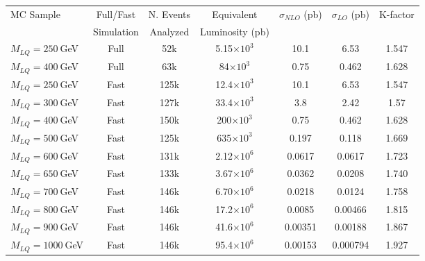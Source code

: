 \begin{table}[htb]
  \label{tab:NumEvents}
  \begin{center}
    \begin{tabular}{|l|cccccc|} \hline\hline
      MC Sample                   & Full/Fast & N. Events & Equivalent             & $\sigma_{NLO}$ (pb) & $\sigma_{LO}$ (pb) & K-factor \\
                                  & Simulation& Analyzed  & Luminosity (pb)        &                     &                    &    \\ \hline\hline
      $M_{LQ}=250~$GeV            & Full      & 52k       &    5.15$\times 10^3$   & 10.1                & 6.53               & 1.547\\
      $M_{LQ}=400~$GeV            & Full      & 63k       &      84$\times 10^3$   &  0.75		 & 0.462	      & 1.628\\ \hline
      $M_{LQ}=250~$GeV            & Fast      & 125k      &    12.4$\times 10^3$   & 10.1		 & 6.53		      & 1.547\\
      $M_{LQ}=300~$GeV            & Fast      & 127k      &    33.4$\times 10^3$   &  3.8	         & 2.42		      & 1.57\\
      $M_{LQ}=400~$GeV            & Fast      & 150k      &     200$\times 10^3$   &  0.75	         & 0.462	      & 1.628\\
      $M_{LQ}=500~$GeV            & Fast      & 125k      &     635$\times 10^3$   &  0.197  	         & 0.118	      & 1.669\\
      $M_{LQ}=600~$GeV            & Fast      & 131k      &    2.12$\times 10^6$   &  0.0617             & 0.0617             & 1.723\\
      $M_{LQ}=650~$GeV            & Fast      & 133k      &    3.67$\times 10^6$   &  0.0362 	         & 0.0208	      & 1.740\\
      $M_{LQ}=700~$GeV            & Fast      & 146k      &    6.70$\times 10^6$   &  0.0218 	         & 0.0124	      & 1.758\\
      $M_{LQ}=800~$GeV            & Fast      & 146k      &    17.2$\times 10^6$   &  0.0085 	         & 0.00466	      & 1.815\\
      $M_{LQ}=900~$GeV            & Fast      & 146k      &    41.6$\times 10^6$   &  0.00351	         & 0.00188	      & 1.867\\
      $M_{LQ}=1000~$GeV           & Fast      & 146k      &    95.4$\times 10^6$   &  0.00153            & 0.000794           & 1.927\\ \hline

\end{tabular}
\end{center}
\end{table}
